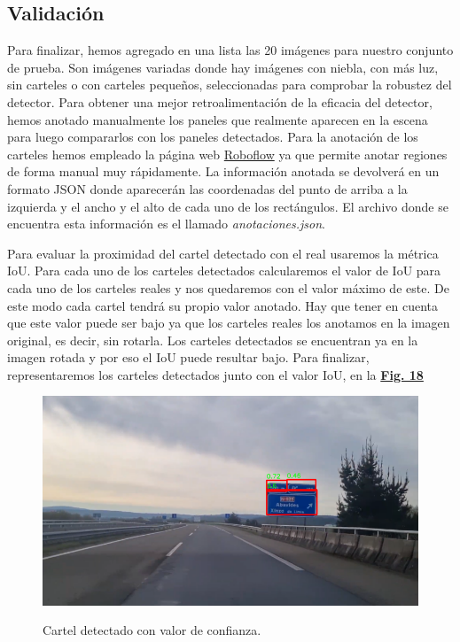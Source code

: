 \documentclass[a4paper, 12pt]{article}
\begin{document}
\subsection{Validación}
Para finalizar, hemos agregado en una lista las 20 imágenes para nuestro conjunto de prueba. Son imágenes variadas donde hay imágenes con niebla, con más luz, sin carteles o con carteles pequeños, seleccionadas para comprobar la robustez del detector. Para obtener una mejor retroalimentación de la eficacia del detector, hemos anotado manualmente los paneles que realmente aparecen en la escena para luego compararlos con los paneles detectados. Para la anotación de los carteles hemos empleado la página web \href{https://roboflow.com/}{Roboflow} ya que permite anotar regiones de forma manual muy rápidamente. La información anotada se devolverá en un formato JSON donde aparecerán las coordenadas del punto de arriba a la izquierda y el ancho y el alto de cada uno de los rectángulos. El archivo donde se encuentra esta información es el llamado \textit{anotaciones.json}.

Para evaluar la proximidad del cartel detectado con el real usaremos la métrica IoU. Para cada uno de los carteles detectados calcularemos el valor de IoU para cada uno de los carteles reales y nos quedaremos con el valor máximo de este. De este modo cada cartel tendrá su propio valor anotado. Hay que tener en cuenta que este valor puede ser bajo ya que los carteles reales los anotamos en la imagen original, es decir, sin rotarla. Los carteles detectados se encuentran ya en la imagen rotada y por eso el IoU puede resultar bajo. Para finalizar, representaremos los carteles detectados junto con el valor IoU, en la \textbf{\hyperref[fig:cartelIoU]{Fig. 18}}
\begin{figure}[h]
	\centering
	\caption{Cartel detectado con valor de confianza.}\vspace{0.5cm}
	\includegraphics[width=0.7\linewidth]{img/cartelConIoU.png}
	\label{fig:cartelIoU}
\end{figure}
\end{document}
